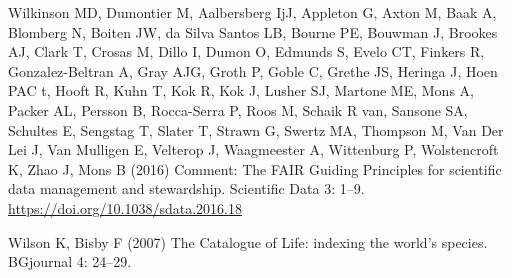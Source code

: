 \documentclass[
]{article}
\newlength{\cslhangindent}
\newlength{\cslentryspacingunit} %
\newenvironment{CSLReferences}[2] %
 {%
  \setlength{\parindent}{0pt}
  \ifodd #1
  \let\oldpar\par
  \def\par{\hangindent=\cslhangindent\oldpar}
  \fi
  \setlength{\parskip}{#2\cslentryspacingunit}
 }%
 {}
\begin{document}
\begin{CSLReferences}{1}{0}
\leavevmode{}%
Wilkinson MD, Dumontier M, Aalbersberg IjJ, Appleton G, Axton M, Baak A,
Blomberg N, Boiten JW, da Silva Santos LB, Bourne PE, Bouwman J, Brookes
AJ, Clark T, Crosas M, Dillo I, Dumon O, Edmunds S, Evelo CT, Finkers R,
Gonzalez-Beltran A, Gray AJG, Groth P, Goble C, Grethe JS, Heringa J,
Hoen PAC t, Hooft R, Kuhn T, Kok R, Kok J, Lusher SJ, Martone ME, Mons
A, Packer AL, Persson B, Rocca-Serra P, Roos M, Schaik R van, Sansone
SA, Schultes E, Sengstag T, Slater T, Strawn G, Swertz MA, Thompson M,
Van Der Lei J, Van Mulligen E, Velterop J, Waagmeester A, Wittenburg P,
Wolstencroft K, Zhao J, Mons B (2016) {Comment: The FAIR Guiding
Principles for scientific data management and stewardship}. Scientific
Data 3: 1--9. \url{https://doi.org/10.1038/sdata.2016.18}

\leavevmode{}%
Wilson K, Bisby F (2007) {The Catalogue of Life: indexing the world's
species}. BGjournal 4: 24--29.

\end{CSLReferences}
\end{document}
